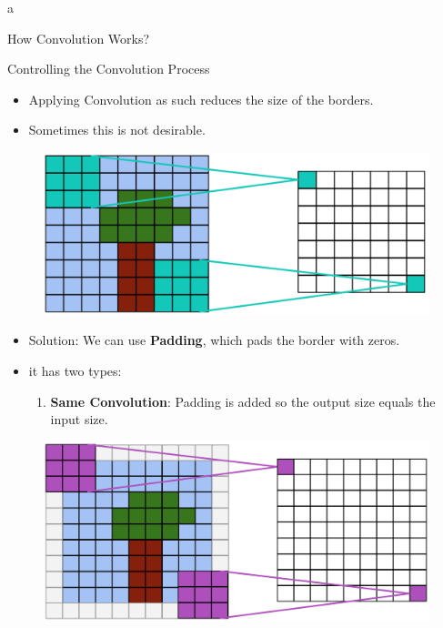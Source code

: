 a\documentclass[10pt]{beamer}
\theoremstyle{remark}
\theoremstyle{definition}
\begin{document}
\begin{frame}[allowframebreaks]{How Convolution Works?}
    
\end{frame}


\begin{frame}[allowframebreaks]{Controlling the Convolution Process}
\begin{itemize}
    \item Applying Convolution as such reduces the size of the borders.
    \item Sometimes this is not desirable.
\end{itemize}


\begin{figure}
\centering
\includegraphics[width=1.0\textwidth,height=0.7\textheight,keepaspectratio]{./images/pad_1.png}
\end{figure}

\framebreak

\begin{itemize}
    \item Solution: We can use \textbf{Padding}, which pads the border with zeros.
    \item it has two types:
    \begin{enumerate}
    \item \textbf{Same Convolution}: Padding is added so the output size equals the input size.
    \end{enumerate}
\end{itemize}


\begin{figure}
\centering
\includegraphics[width=1.0\textwidth,height=0.8\textheight,keepaspectratio]{./images/pad_3.png}
\end{figure}



\end{frame}
\end{document}
